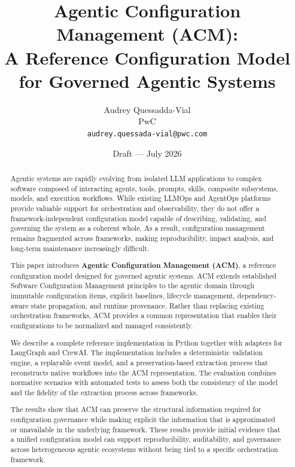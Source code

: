 \documentclass[10pt]{article}
\title{\textbf{Agentic Configuration Management (ACM):\\A Reference Configuration Model for Governed Agentic Systems}}
\author{
  Audrey Quessadda-Vial\\
  PwC\\
  \texttt{audrey.quessada-vial@pwc.com}
}
\date{Draft --- July 2026}
\begin{document}
\maketitle

\begin{abstract}

Agentic systems are rapidly evolving from isolated LLM applications to complex software composed of interacting agents, tools, prompts, skills, composite subsystems, models, and execution workflows. While existing LLMOps and AgentOps platforms provide valuable support for orchestration and observability, they do not offer a framework-independent configuration model capable of describing, validating, and governing the system as a coherent whole. As a result, configuration management remains fragmented across frameworks, making reproducibility, impact analysis, and long-term maintenance increasingly difficult.

This paper introduces \textbf{Agentic Configuration Management (ACM)}, a reference configuration model designed for governed agentic systems. ACM extends established Software Configuration Management principles to the agentic domain through immutable configuration items, explicit baselines, lifecycle management, dependency-aware state propagation, and runtime provenance. Rather than replacing existing orchestration frameworks, ACM provides a common representation that enables their configurations to be normalized and managed consistently.

We describe a complete reference implementation in Python together with adapters for LangGraph and CrewAI. The implementation includes a deterministic validation engine, a replayable event model, and a preservation-based extraction process that reconstructs native workflows into the ACM representation. The evaluation combines normative scenarios with automated tests to assess both the consistency of the model and the fidelity of the extraction process across frameworks.

The results show that ACM can preserve the structural information required for configuration governance while making explicit the information that is approximated or unavailable in the underlying framework. These results provide initial evidence that a unified configuration model can support reproducibility, auditability, and governance across heterogeneous agentic ecosystems without being tied to a specific orchestration framework.

\end{abstract}
\end{document}
